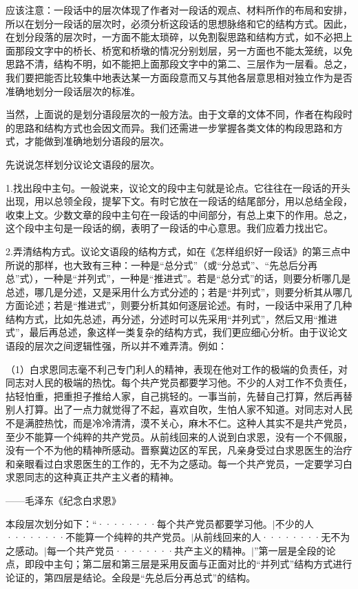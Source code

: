 应该注意：一段话中的层次体现了作者对一段话的观点、材料所作的布局和安排，所以在划分一段话的层次时，必须分析这段话的思想脉络和它的结构方式。因此，在划分段落的层次时，一方面不能太琐碎，以免割裂思路和结构方式，如不必把上面那段文字中的桥长、桥宽和桥墩的情况分别划层，另一方面也不能太笼统，以免思路不清，结构不明，如不能把上面那段文字中的第二、三层作为一层看。总之，我们要把能否比较集中地表达某一方面段意而又与其他各层意思相对独立作为是否准确地划分一段话层次的标准。

当然，上面说的是划分语段层次的一般方法。由于文章的文体不同，作者在构段时的思路和结构方式也会因文而异。我们还需进一步掌握各类文体的构段思路和方式，才能做到准确地划分语段的层次。

先说说怎样划分议论文语段的层次。

1.找出段中主句。一般说来，议论文的段中主句就是论点。它往往在一段话的开头出现，用以总领全段，提挈下文。有时它放在一段话的结尾部分，用以总结全段，收束上文。少数文章的段中主句在一段话的中间部分，有总上束下的作用。总之，这个段中主句是一段话的纲，表明了一段话的中心意思。我们应着力找出它。

2.弄清结构方式。议论文语段的结构方式，如在《怎样组织好一段话》的第三点中所说的那样，也大致有三种：一种是“总分式”（或“分总式”、“先总后分再总”式），一种是“并列式”，一种是“推进式”。若是“总分式”的话，则要分析哪几是总述，哪几是分述，又是采用什么方式分述的；若是“并列式”，则要分析其从哪几方面论述；若是“推进式”，则要分析其如何逐层论述。有时，一段话中采用了几种结构方式，比如先总述，再分述，分述时可以先采用“并列式”，然后又用“推进式”，最后再总述，象这样一类复杂的结构方式，我们更应细心分析。由于议论文语段的层次之间逻辑性强，所以并不难弄清。例如：

（1）白求恩同志毫不利己专门利人的精神，表现在他对工作的极端的负责任，对同志对人民的极端的热忱。每个共产党员都要学习他。不少的人对工作不负责任，拈轻怕重，把重担子推给人家，自己挑轻的。一事当前，先替自己打算，然后再替别人打算。出了一点力就觉得了不起，喜欢自吹，生怕人家不知道。对同志对人民不是满腔热忱，而是冷冷清清，漠不关心，麻木不仁。这种人其实不是共产党员，至少不能算一个纯粹的共产党员。从前线回来的人说到白求恩，没有一个不佩服，没有一个不为他的精神所感动。晋察冀边区的军民，凡亲身受过白求恩医生的治疗和亲眼看过白求恩医生的工作的，无不为之感动。每一个共产党员，一定要学习白求恩同志的这种真正共产主义者的精神。
\begin{flushright}
——毛泽东《纪念白求恩》
\end{flushright}

本段层次划分如下：“········每个共产党员都要学习他。$\vert$不少的人········不能算一个纯粹的共产党员。$\vert$从前线回来的人········无不为之感动。$\vert$每一个共产党员········共产主义的精神。$\vert$”第一层是全段的论点，即段中主句；第二层和第三层是采用反面与正面对比的“并列式”结构方式进行论证的，第四层是结论。全段是“先总后分再总式”的结构。

